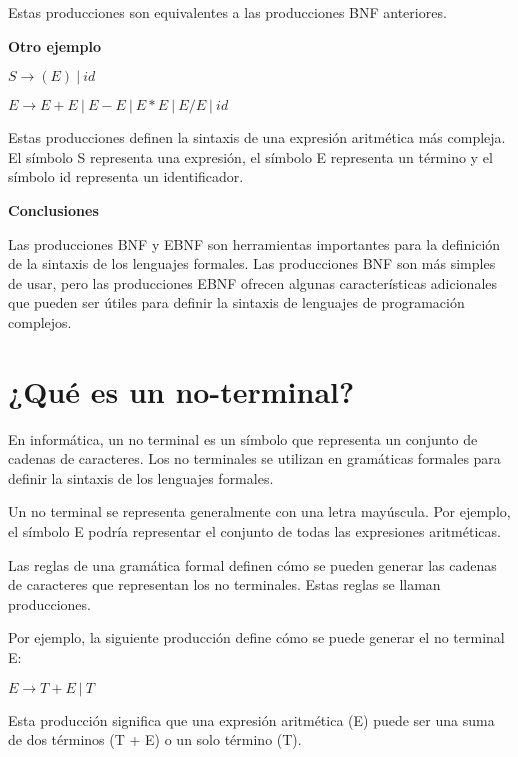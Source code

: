 Estas producciones son equivalentes a las producciones BNF anteriores.

\phantom{text}

\noindent \textbf{Otro ejemplo}

\phantom{text}

\begin{center}
    $S \xrightarrow{} ( E )\: |\: id$
    
    $E \xrightarrow{} E + E\: |\: E - E\: |\: E * E\: |\: E / E\: |\: id$
\end{center}

Estas producciones definen la sintaxis de una expresión aritmética más compleja. El símbolo S representa una expresión, el símbolo E representa un término y el símbolo id representa un identificador.

\textbf{Conclusiones}

Las producciones BNF y EBNF son herramientas importantes para la definición de la sintaxis de los lenguajes formales. Las producciones BNF son más simples de usar, pero las producciones EBNF ofrecen algunas características adicionales que pueden ser útiles para definir la sintaxis de lenguajes de programación complejos.





\section{¿Qué es un no-terminal?}

\noindent En informática, un no terminal es un símbolo que representa un conjunto de cadenas de caracteres. Los no terminales se utilizan en gramáticas formales para definir la sintaxis de los lenguajes formales.

Un no terminal se representa generalmente con una letra mayúscula. Por ejemplo, el símbolo E podría representar el conjunto de todas las expresiones aritméticas.

Las reglas de una gramática formal definen cómo se pueden generar las cadenas de caracteres que representan los no terminales. Estas reglas se llaman producciones.

Por ejemplo, la siguiente producción define cómo se puede generar el no terminal E:

\begin{center}
    $E \xrightarrow{} T + E\: |\: T$
\end{center}

Esta producción significa que una expresión aritmética (E) puede ser una suma de dos términos (T + E) o un solo término (T).

